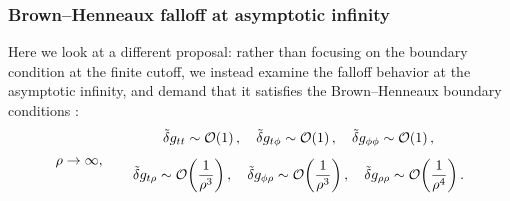 \documentclass[12pt,a4paper,utf8]{article}
\newcommand{\tvar}[1]{\mathinner{\tilde{\delta} #1}}
\begin{document}
\subsubsection{Brown--Henneaux falloff at asymptotic infinity}
	
	Here we look at a different proposal: rather than focusing on the boundary condition at the finite cutoff, we instead examine the falloff behavior at the asymptotic infinity, and demand that it satisfies the Brown--Henneaux boundary conditions \cite{Brown:1986nw}:
	\begin{equation}
	\rho\to\infty, \qquad
	\begin{gathered}
		\tvar{g_{tt}} \sim \order{1},
	\quad
		\tvar{g_{t\phi}} \sim \order{1},
	\quad
		\tvar{g_{\phi\phi}} \sim \order{1},
	\\[1ex]
		\tvar{g_{t\rho}}
		\sim \order{\frac{1}{\rho^3}},
	\quad
		\tvar{g_{\phi\rho}}
		\sim \order{\frac{1}{\rho^3}},
	\quad
		\tvar{g_{\rho\rho}}
		\sim \order{\frac{1}{\rho^4}}.
	\end{gathered}
	\end{equation}
	
\pagebreak[3]
	
\end{document}
